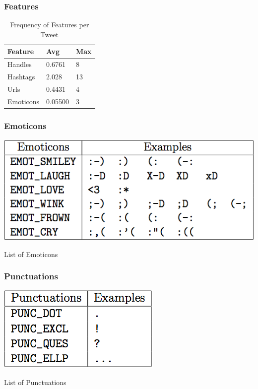 \documentclass{beamer}
\begin{document}

\begin{frame}
\frametitle{Features}

\begin{table}[h]
\centering
	\begin{tabular}{ l l l }
	\toprule
	\textbf{Feature    }& \textbf{Avg }& \textbf{Max }\\
	\midrule
	Handles    & 0.6761 & 8 \\
	Hashtags   & 2.028 & 13 \\
	Urls       & 0.4431 & 4 \\
	Emoticons  & 0.05500 & 3 \\
	\bottomrule
	\end{tabular}
\caption{Frequency of Features per Tweet}
\label{table:preproc_freq}
\end{table}

\end{frame}


\begin{frame}
\frametitle{Emoticons}
\begin{table}[h]
\centering
\includegraphics[scale=0.5]{img/table_emoticons.png}
\caption{List of Emoticons}
\label{table:emot}
\end{table}
\end{frame}


\begin{frame}
\frametitle{Punctuations}
\begin{table}[h]
\centering
\includegraphics[scale=0.5]{img/table_punctuations.png}
\caption{List of Punctuations}
\label{table:punc}
\end{table}
\end{frame}
\end{document}
